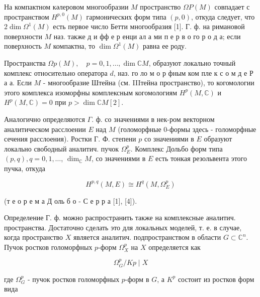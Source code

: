 \documentclass[10pt]{article}
\begin{document}
На компактном кәлеровом многообразии $M$ пространство $\Omega P(M)$ совпадает с пространством $H^{p, 0}(M)$ гармонических форм типа $(p, 0)$, откуда следует, что $2 \operatorname{dim} \Omega^{1}(M)$ есть первое число Бетти многообразия [1]. Г. ф. на римановой поверхности $M$ наз. также д и фф е р енци ал а ми п е р в о го р о д а; если поверхность $M$ компактна, то $\operatorname{dim} \Omega^{1}(M)$ равна ее роду.



Пространства $\Omega p(M), \quad p=0,1, \ldots, \operatorname{dim} \mathbb{C} M$, образуют локально точный комплекс относительно оператора $d$, наз. го ло м о р фным ком пле к с о м д е Р а а. Если $M$ - многообразие Штейна (см. IIIтейна пространство), то когомологии этого комплекса изоморфны комплексным когомологиям $H^{p}(M, \mathbb{C})$ и $H^{p}(M, \mathbb{C})=0$ при $p>\operatorname{dim} \mathbb{C} M[2]$.



Аналогично определяются $\Gamma$. ф. со значениями в нек-ром векторном аналитическом расслоении $E$ над $M$ (голоморфные 0-формы здесь - голоморфные сечения расслоения). Ростки Г. Ф. степени $p$ со значениями в $E$ образуют локально свободный аналитич. пучок $\Omega_{E}^{p}$. Комплекс Дольбо форм типа $(p, q), q=0,1, \ldots$, $\operatorname{dim}_{\mathbb{C}} M$, со значениями в $E$ есть тонкая резольвента этого пучка, откуда



\[

H^{p, q}(M, E) \cong H^{q}\left(M, \Omega_{E}^{p}\right)

\]



(т е о р е м а Д оль б о - С е р р а [1], [4]).



Определение Г. ф. можно распространить также на комплексные аналитич. пространства. Достаточно сделать это для локальных моделей, т. е. в случае, когда пространство $X$ является аналитич. подпространством в области $G \subset \mathbb{C}^{n}$. Пучок ростков голоморфных $p$-форм $\Omega_{X}^{p}$ на $X$ определяется как



\[

\Omega_{G}^{p} / K p \mid X

\]



где $\Omega_{G}^{p}$ - пучок ростков голоморфных $p$-форм в $G$, а $K^{p}$ состоит из ростков форм вида
\end{document}
